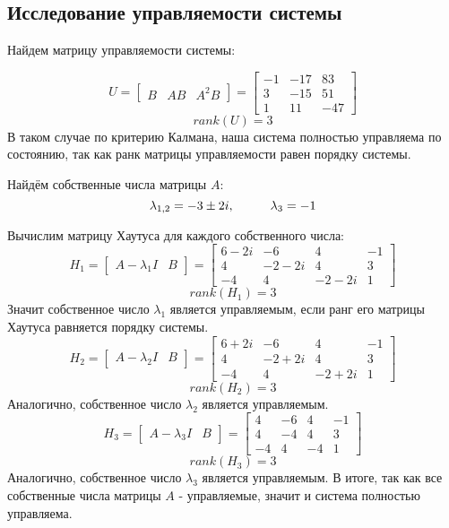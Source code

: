 \subsection{Исследование управляемости системы}

Найдем матрицу управляемости системы:

$$
    U = \begin{bmatrix}
      B & AB & A^2B
    \end{bmatrix} =  \begin{bmatrix}
      -1 & -17 & 83 \\
      3 & -15 & 51 \\
      1 & 11 & -47
    \end{bmatrix}
$$
$$
  rank(U) = 3
$$
В таком случае по критерию Калмана, наша система полностью управляема по состоянию, так как ранк матрицы управляемости равен порядку системы.

Найдём собственные числа матрицы $A$:
$$
    \lambda_{1,2} = -3 \pm 2i, \hspace*{1cm} \lambda_3 = -1 
$$

Вычислим матрицу Хаутуса для каждого собственного числа:
$$
    H_1 = \begin{bmatrix}
          A - \lambda_1 I & B   
          \end{bmatrix} = 
    \begin{bmatrix}
    6-2i & -6 & 4 & -1 \\  
    4 & -2-2i & 4 & 3 \\  
    -4 & 4 & -2 -2i & 1   
    \end{bmatrix}
$$
$$
rank(H_1) = 3
$$
Значит собственное число $\lambda_1$ является управляемым, если ранг его матрицы Хаутуса равняется порядку системы.
$$
    H_2 = \begin{bmatrix}
          A - \lambda_2 I & B   
          \end{bmatrix} = 
    \begin{bmatrix}
      6+2i & -6 & 4 & -1 \\  
      4 & -2+2i & 4 & 3 \\  
      -4 & 4 & -2+2i & 1  
    \end{bmatrix}
$$
$$
rank(H_2) = 3
$$
Аналогично, собственное число $\lambda_2$ является управляемым.
$$
    H_3 = \begin{bmatrix}
          A - \lambda_3 I & B   
          \end{bmatrix} = 
    \begin{bmatrix}
      4 & -6 & 4 & -1 \\
      4 & -4 & 4 & 3 \\
      -4 & 4 & -4 & 1
    \end{bmatrix}
$$
$$
rank(H_3) = 3
$$
Аналогично, собственное число $\lambda_3$ является управляемым. В итоге, так как все собственные числа матрицы $A$ - управляемые, значит и система полностью управляема.

